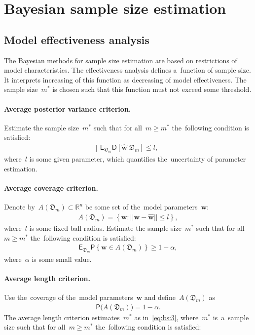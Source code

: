 \documentclass[
11pt,%
tightenlines,%
twoside,%
onecolumn,%
nofloats,%
nobibnotes,%
nofootinbib,%
superscriptaddress,%
noshowpacs,%
centertags]%
{revtex4}
\begin{document}
\section{Bayesian sample size estimation}
\subsection{Model effectiveness analysis}
The Bayesian methods for sample size estimation are based on
restrictions of model  characteristics. The effectiveness analysis
defines a~function of sample size. It interprets increasing of this
function as decreasing of model effectiveness. The sample size~$m^*$
is chosen such that this function must not exceed some threshold.

\paragraph{Average posterior variance criterion.}
Estimate the sample size~$m^*$ such that for all~$m \geq m^*$ the~following condition is satisfied:
\[]
\label{eq:bs:1}
\begin{aligned}
    \mathsf{E}_{\mathfrak{D}_m}\mathsf{D}\left[\hat{\mathbf{w}}|\mathfrak{D}_m\right] \leq l,
\end{aligned}
\]
where~$l$ is some given parameter, which quantifies the~uncertainty of parameter estimation.

\paragraph{Average coverage criterion.}
Denote by~$A\left(\mathfrak{D}_{m}\right) \subset \mathbb{R}^n$ be some set of the~model parameters~$\mathbf{w}$:
\[
\label{eq:bs:2}
\begin{aligned}
    A\left(\mathfrak{D}_{m}\right) = \left\{\mathbf{w}:||\mathbf{w} - \hat{\mathbf{w}}||\leq l\right\},
\end{aligned}
\]
where~$l$ is some fixed ball radius. Estimate the sample size~$m^*$ such that for all~$m \geq m^*$ the~following condition is satisfied:
\begin{equation}
\label{eq:bs:3}
\begin{aligned}
    \mathsf{E}_{\mathfrak{D}_m}\mathsf{P}\left\{\mathbf{w} \in A\left(\mathfrak{D}_m\right)\right\} \geq 1-\alpha,
\end{aligned}
\end{equation}
where~$\alpha$ is some small value.

\paragraph{Average length criterion.}
Use the~coverage of the~model parameters~$\mathbf{w}$ and define~$A\left(\mathfrak{D}_{m}\right)$ as
\[
\label{eq:bs:4}
\begin{aligned}
    \mathsf{P}\bigl(A\left(\mathfrak{D}_{m}\right)\bigr) = 1- \alpha.
\end{aligned}
\]
The average length criterion estimates~$m^*$ as in~\eqref{eq:bs:3},
where~$m^*$ is~a~sample size such that for all~$m \geq m^*$
the~following condition is satisfied:
\end{document}
